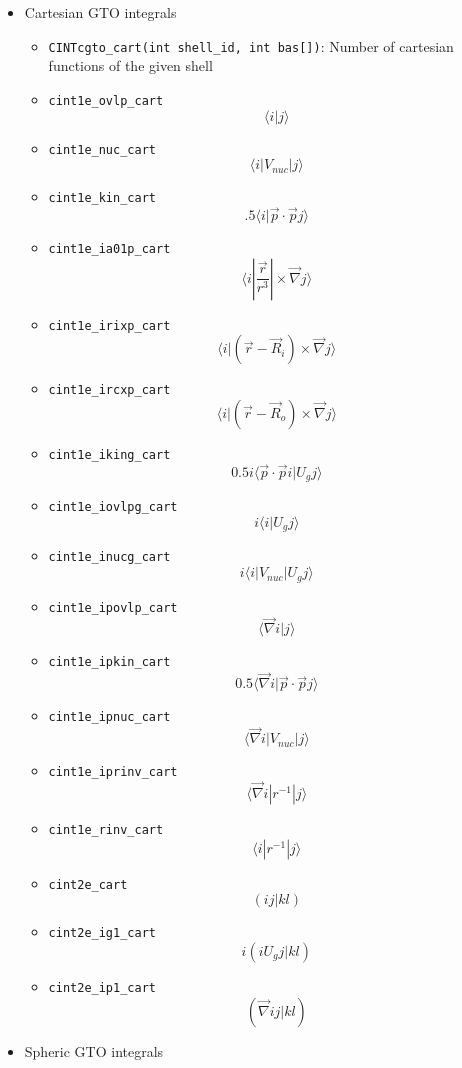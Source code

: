 \documentclass[]{article}
\begin{document}
\begin{itemize}
\itemsep1pt\parskip0pt
\item
  Cartesian GTO integrals

  \begin{itemize}
  \itemsep1pt\parskip0pt
  \item
    \texttt{CINTcgto\_cart(int shell\_id, int bas{[}{]})}: Number of
    cartesian functions of the given shell
  \item
    \texttt{cint1e\_ovlp\_cart} \[\langle i| j\rangle \]
  \item
    \texttt{cint1e\_nuc\_cart} \[\langle i| V_{nuc} | j\rangle \]
  \item
    \texttt{cint1e\_kin\_cart}
    \[.5\langle i| \vec{p} \cdot \vec{p} j\rangle \]
  \item
    \texttt{cint1e\_ia01p\_cart}
    \[\langle i| \frac{\vec{r}}{r^3}| \times \vec{\nabla} j\rangle \]
  \item
    \texttt{cint1e\_irixp\_cart}
    \[\langle i| (\vec{r}-\vec{R}_i) \times \vec{\nabla} j\rangle \]
  \item
    \texttt{cint1e\_ircxp\_cart}
    \[\langle i| (\vec{r}-\vec{R}_o) \times \vec{\nabla} j\rangle \]
  \item
    \texttt{cint1e\_iking\_cart}
    \[0.5i\langle \vec{p} \cdot \vec{p} i| U_gj\rangle \]
  \item
    \texttt{cint1e\_iovlpg\_cart} \[i \langle i| U_gj\rangle \]
  \item
    \texttt{cint1e\_inucg\_cart} \[i \langle i| V_{nuc}| U_gj\rangle \]
  \item
    \texttt{cint1e\_ipovlp\_cart} \[\langle \vec{\nabla} i|j\rangle \]
  \item
    \texttt{cint1e\_ipkin\_cart}
    \[0.5\langle \vec{\nabla} i| \vec{p} \cdot \vec{p} j\rangle \]
  \item
    \texttt{cint1e\_ipnuc\_cart}
    \[\langle \vec{\nabla} i| V_{nuc}|j\rangle \]
  \item
    \texttt{cint1e\_iprinv\_cart}
    \[\langle \vec{\nabla} i| r^{-1}|j\rangle \]
  \item
    \texttt{cint1e\_rinv\_cart} \[\langle i| r^{-1} |j\rangle \]
  \item
    \texttt{cint2e\_cart} \[(ij|kl)\]
  \item
    \texttt{cint2e\_ig1\_cart} \[i(i U_g j|kl)\]
  \item
    \texttt{cint2e\_ip1\_cart} \[(\vec{\nabla} i j|kl)\]
  \end{itemize}
\item
  Spheric GTO integrals


\end{itemize}
\end{document}
